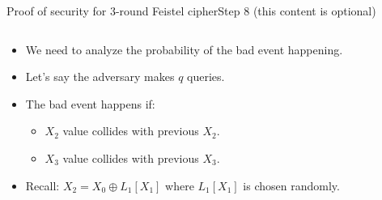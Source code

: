 \documentclass[aspectratio=169, lualatex, handout]{beamer}
\begin{document}
	\begin{frame}{Proof of security for 3-round Feistel cipher}{Step 8 (this content is optional)}
		\begin{columns}[c]
			\begin{column}{0.5\textwidth}
				\begin{itemize}[<+->]
					\item We need to analyze the probability of the bad event happening.
					\item Let's say the adversary makes $q$ queries.
					\item The bad event happens if:
					      \begin{itemize}[<+->]
						      \item $X_2$ value collides with previous $X_2$.
						      \item $X_3$ value collides with previous $X_3$.
					      \end{itemize}
					\item Recall: $X_2 = X_0 \oplus L_1[X_1]$ where $L_1[X_1]$ is chosen randomly.
				\end{itemize}
			\end{column}
			\begin{column}{0.5\textwidth}
				\vspace{-1.5cm}
				\begin{center}
				\end{center}
			\end{column}
		\end{columns}
	\end{frame}
\end{document}
